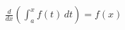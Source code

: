 \documentclass[preview]{standalone}
\begin{document}
\begin{align*}
\frac{d}{dx}\left(\int_{a}^{x} f(t)\,dt\right) = f(x)
\end{align*}
\end{document}
